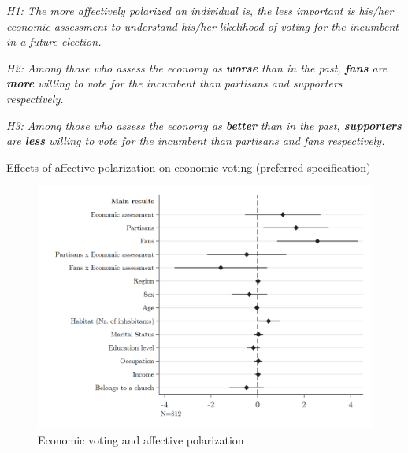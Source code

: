\documentclass[a4paper, svgnames]{article}
\begin{document}
\textit{H1: The more affectively polarized an individual is, the less important is his/her economic assessment to understand his/her likelihood of voting for the incumbent in a future election.}

\textit{H2: Among those who assess the economy as \textbf{worse} than in the past, \textbf{fans} are \textbf{more} willing to vote for the incumbent than partisans and supporters respectively.}

\textit{H3: Among those who assess the economy as \textbf{better} than in the past, \textbf{supporters} are \textbf{less} willing to vote for the incumbent than partisans and fans respectively.}

\begin{table}[H]
	\label{coefplot}
	\centering
	\caption{\label{tab:preferred_model} Effects of affective polarization on economic voting (preferred specification)}
	

\end{table}

\begin{figure}[H]
	\centering
	\includegraphics[scale=0.35]{Figures/new.png}
	\caption{\label{fig:preferred_model} Economic voting and affective polarization}
\end{figure}
\end{document}
